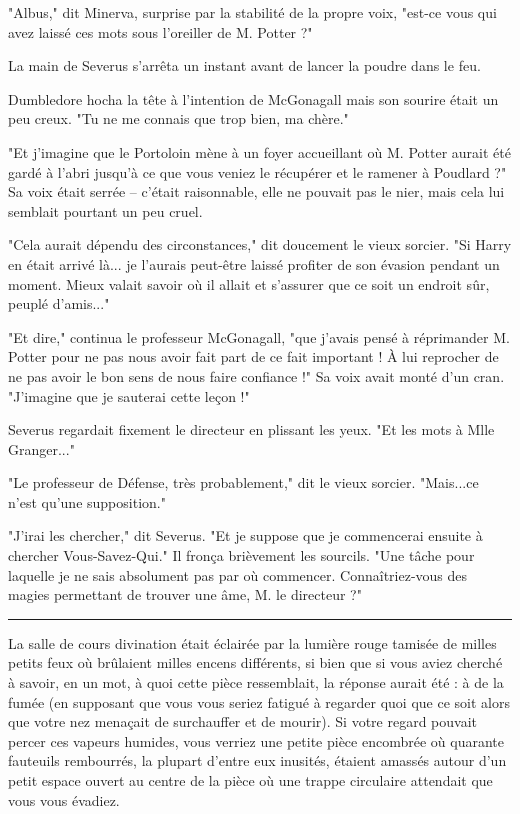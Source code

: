 "Albus," dit Minerva, surprise par la stabilité de la propre voix, "est-ce vous qui avez laissé ces mots sous l'oreiller de M. Potter ?"

La main de Severus s'arrêta un instant avant de lancer la poudre dans le feu.

Dumbledore hocha la tête à l'intention de McGonagall mais son sourire était un peu creux. "Tu ne me connais que trop bien, ma chère."

"Et j'imagine que le Portoloin mène à un foyer accueillant où M. Potter aurait été gardé à l'abri jusqu'à ce que vous veniez le récupérer et le ramener à Poudlard ?" Sa voix était serrée – c'était raisonnable, elle ne pouvait pas le nier, mais cela lui semblait pourtant un peu cruel.

"Cela aurait dépendu des circonstances," dit doucement le vieux sorcier. "Si Harry en était arrivé là... je l'aurais peut-être laissé profiter de son évasion pendant un moment. Mieux valait savoir où il allait et s'assurer que ce soit un endroit sûr, peuplé d'amis..."

"Et dire," continua le professeur McGonagall, "que j'avais pensé à réprimander M. Potter pour ne pas nous avoir fait part de ce fait important ! À lui reprocher de ne pas avoir le bon sens de nous faire confiance !" Sa voix avait monté d'un cran. "J'imagine que je sauterai cette leçon !"

Severus regardait fixement le directeur en plissant les yeux. "Et les mots à Mlle Granger..."

"Le professeur de Défense, très probablement," dit le vieux sorcier. "Mais...ce n'est qu'une supposition."

"J'irai les chercher," dit Severus. "Et je suppose que je commencerai ensuite à chercher Vous-Savez-Qui." Il fronça brièvement les sourcils. "Une tâche pour laquelle je ne sais absolument pas par où commencer. Connaîtriez-vous des magies permettant de trouver une âme, M. le directeur ?"
\par\noindent\rule{\textwidth}{0.4pt}
La salle de cours divination était éclairée par la lumière rouge tamisée de milles petits feux où brûlaient milles encens différents, si bien que si vous aviez cherché à savoir, en un mot, à quoi cette pièce ressemblait, la réponse aurait été : à de la fumée (en supposant que vous vous seriez fatigué à regarder quoi que ce soit alors que votre nez menaçait de surchauffer et de mourir). Si votre regard pouvait percer ces vapeurs humides, vous verriez une petite pièce encombrée où quarante fauteuils rembourrés, la plupart d'entre eux inusités, étaient amassés autour d'un petit espace ouvert au centre de la pièce où une trappe circulaire attendait que vous vous évadiez.

